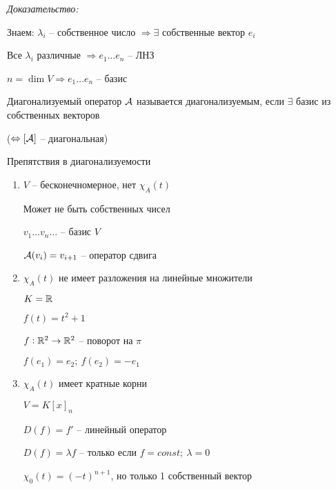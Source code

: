 \documentclass[12pt]{article}
\begin{document}
\textit{Доказательство:}

Знаем: $\lambda_i$ -- собственное число $\Rightarrow \exists$ собственные вектор $e_i$

Все $\lambda_i$ различные $\Rightarrow e_1 \ldots e_n$ -- ЛНЗ

$n = \dim V \Rightarrow e_1 \ldots e_n$ -- базис

\begin{defin}{Диагонализуемый оператор}
    $\mathcal{A}$ называется диагонализуемым, если $\exists$ базис из собственных векторов

    ($\Leftrightarrow [\mathcal{A}]$ -- диагональная)
\end{defin}

\begin{Remark}{Препятствия в диагонализуемости}
    \begin{enumerate}
        \item $V$ -- бесконечномерное, нет $\chi_A(t)$
        
        Может не быть собственных чисел

        \begin{Example}{}
            $v_1 \ldots v_n \ldots$ -- базис $V$

            $\mathcal{A}(v_i) = v_{i + 1}$ -- оператор сдвига
        \end{Example}

        \item $\chi_A(t)$ не имеет разложения на линейные множители
        
        \begin{Example}{}
            $K = \mathbb R$

            $f(t) = t^2 + 1$

            $f: \mathbb R^2 \to \mathbb R^2$ -- поворот на $\pi$

            $f(e_1) = e_2;\ f(e_2) = -e_1$
        \end{Example}

        \item $\chi_A(t)$ имеет кратные корни
        
        \begin{Example}{}
            $V = K[x]_n$

            $D(f) = f'$ -- линейный оператор

            $D(f) = \lambda f$ -- только если $f = const;\ \lambda = 0$

            $\chi_0(t) = (-t)^{n + 1}$, но только 1 собственный вектор
        \end{Example}
    \end{enumerate}
\end{Remark}
\end{document}
